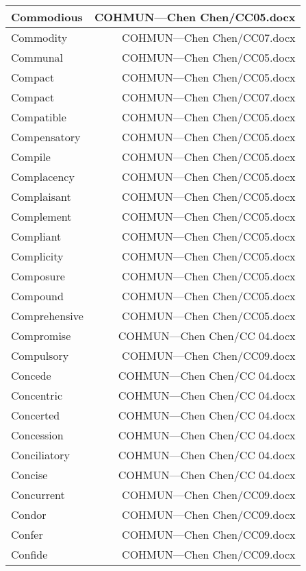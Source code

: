 \documentclass{article}
\begin{document}
\begin{center}
\begin{longtable}{|l|r|}
\hline
Commodious  &  COHMUN---Chen Chen/CC05.docx\\  
\hline
Commodity  &  COHMUN---Chen Chen/CC07.docx\\  
\hline
Communal  &  COHMUN---Chen Chen/CC05.docx\\  
\hline
Compact  &  COHMUN---Chen Chen/CC05.docx\\  
\hline
Compact  &  COHMUN---Chen Chen/CC07.docx\\  
\hline
Compatible  &  COHMUN---Chen Chen/CC05.docx\\  
\hline
Compensatory  &  COHMUN---Chen Chen/CC05.docx\\  
\hline
Compile  &  COHMUN---Chen Chen/CC05.docx\\  
\hline
Complacency  &  COHMUN---Chen Chen/CC05.docx\\  
\hline
Complaisant  &  COHMUN---Chen Chen/CC05.docx\\  
\hline
Complement  &  COHMUN---Chen Chen/CC05.docx\\  
\hline
Compliant  &  COHMUN---Chen Chen/CC05.docx\\  
\hline
Complicity  &  COHMUN---Chen Chen/CC05.docx\\  
\hline
Composure  &  COHMUN---Chen Chen/CC05.docx\\  
\hline
Compound  &  COHMUN---Chen Chen/CC05.docx\\  
\hline
Comprehensive  &  COHMUN---Chen Chen/CC05.docx\\  
\hline
Compromise  &  COHMUN---Chen Chen/CC 04.docx\\  
\hline
Compulsory  &  COHMUN---Chen Chen/CC09.docx\\  
\hline
Concede  &  COHMUN---Chen Chen/CC 04.docx\\  
\hline
Concentric  &  COHMUN---Chen Chen/CC 04.docx\\  
\hline
Concerted  &  COHMUN---Chen Chen/CC 04.docx\\  
\hline
Concession  &  COHMUN---Chen Chen/CC 04.docx\\  
\hline
Conciliatory  &  COHMUN---Chen Chen/CC 04.docx\\  
\hline
Concise  &  COHMUN---Chen Chen/CC 04.docx\\  
\hline
Concurrent  &  COHMUN---Chen Chen/CC09.docx\\  
\hline
Condor  &  COHMUN---Chen Chen/CC09.docx\\  
\hline
Confer  &  COHMUN---Chen Chen/CC09.docx\\  
\hline
Confide  &  COHMUN---Chen Chen/CC09.docx\\  

\end{longtable}
\end{center}
\end{document}
